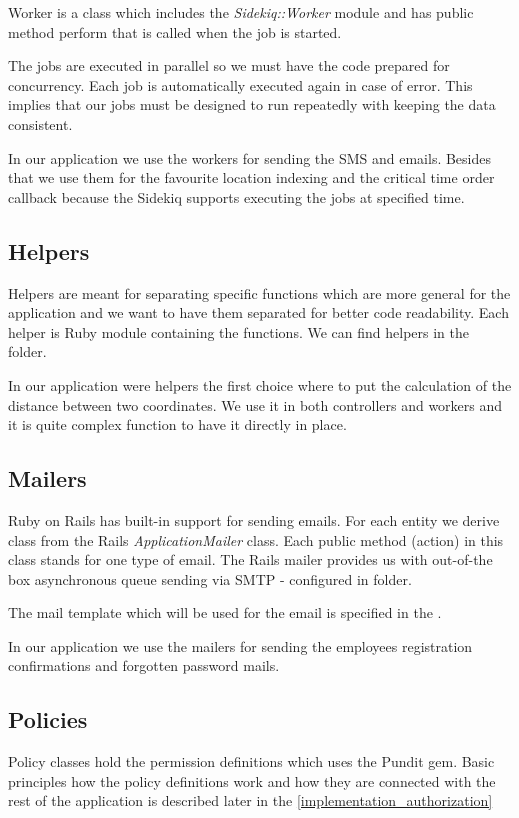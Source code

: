 		Worker is a class which includes the \textit{Sidekiq::Worker} module and has public method perform that is called when the job is started. 
		
		The jobs are executed in parallel so we must have the code prepared for concurrency. Each job is automatically executed again in case of error. This implies that our jobs must be designed to run repeatedly with keeping the data consistent.
		
		In our application we use the workers for sending the SMS and emails. Besides that we use them for the favourite location indexing and the critical time order callback because the Sidekiq supports executing the jobs at specified time.

	\subsection{Helpers}
		 Helpers are meant for separating specific functions which are more general for the application and we want to have them separated for better code readability. Each helper is Ruby module containing the functions. We can find helpers in the  folder.
		
		In our application were helpers the first choice where to put the calculation of the distance between two coordinates. We use it in both controllers and workers and it is quite complex function to have it directly in place.
		
	\subsection{Mailers}
		Ruby on Rails has built-in support for sending emails. For each entity we derive class from the Rails \textit{ApplicationMailer} class. Each public method (action) in this class stands for one type of email. The Rails mailer provides us with out-of-the box asynchronous queue sending via SMTP - configured in  folder.
		 
		 The mail template which will be used for the email is specified in the .
		 
		 In our application we use the mailers for sending the employees registration confirmations and forgotten password mails.

		
	\subsection{Policies}
		Policy classes hold the permission definitions which uses the Pundit gem. Basic principles how the policy definitions work and how they are connected with the rest of the application is described later in the \ref{implementation_authorization} 
